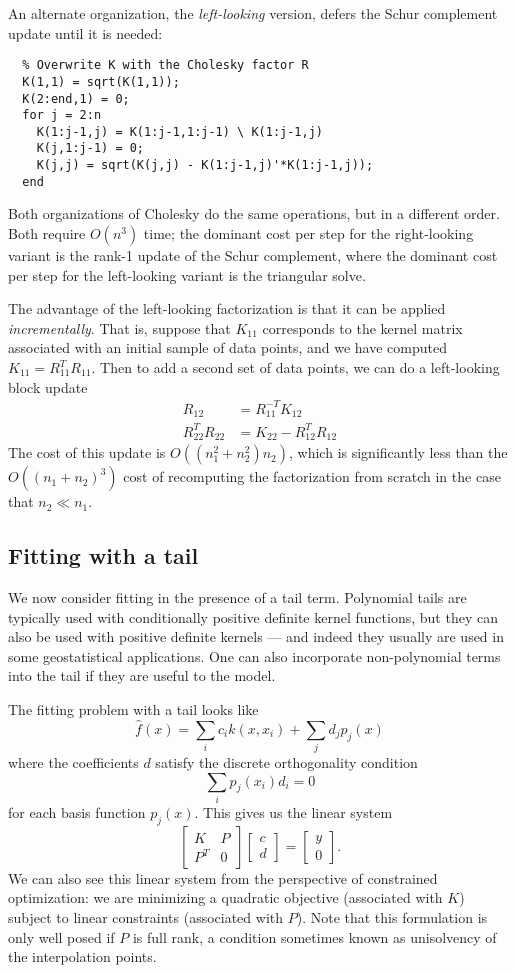 \documentclass[12pt, leqno]{article} %
\begin{document}
An alternate organization, the {\em left-looking} version,
defers the Schur complement update until it is needed:
\begin{lstlisting}
  % Overwrite K with the Cholesky factor R
  K(1,1) = sqrt(K(1,1));
  K(2:end,1) = 0;
  for j = 2:n
    K(1:j-1,j) = K(1:j-1,1:j-1) \ K(1:j-1,j)
    K(j,1:j-1) = 0;
    K(j,j) = sqrt(K(j,j) - K(1:j-1,j)'*K(1:j-1,j));
  end
\end{lstlisting}
Both organizations of Cholesky do the same operations, but in a
different order.  Both require $O(n^3)$ time; the dominant
cost per step for the right-looking variant is the rank-1 update
of the Schur complement, where the dominant cost per step for the
left-looking variant is the triangular solve.

The advantage of the left-looking factorization is that it can be
applied {\em incrementally}.  That is, suppose that $K_{11}$
corresponds to the kernel matrix associated with an initial sample
of data points, and we have computed $K_{11} = R_{11}^T R_{11}$.
Then to add a second set of data points, we can do a left-looking
block update
\begin{align*}
  R_{12} &= R_{11}^{-T} K_{12} \\
  R_{22}^T R_{22} &= K_{22} - R_{12}^T R_{12}
\end{align*}
The cost of this update is $O((n_1^2 + n_2^2) n_2)$, which is
significantly less than the $O((n_1 + n_2)^3)$ cost of recomputing the
factorization from scratch in the case that $n_2 \ll n_1$.

\subsection{Fitting with a tail}

We now consider fitting in the presence of a tail term.  Polynomial
tails are typically used with conditionally positive definite kernel
functions, but they can also be used with positive definite kernels
--- and indeed they usually are used in some geostatistical
applications.  One can also incorporate non-polynomial terms into
the tail if they are useful to the model.

The fitting problem with a tail looks like
\[
  \hat{f}(x) = \sum_i c_i k(x,x_i) + \sum_j d_j p_j(x)
\]
where the coefficients $d$ satisfy the discrete orthogonality
condition
\[
  \sum_i p_j(x_i) d_i = 0
\]
for each basis function $p_j(x)$.  This gives us the linear system
\[
  \begin{bmatrix} K & P \\ P^T & 0 \end{bmatrix}
  \begin{bmatrix} c \\ d \end{bmatrix} =
  \begin{bmatrix} y \\ 0 \end{bmatrix}.
\]
We can also see this linear system from the perspective of constrained
optimization: we are minimizing a quadratic objective (associated with $K$)
subject to linear constraints (associated with $P$).  Note that this
formulation is only well posed if $P$ is full rank, a condition
sometimes known as unisolvency of the interpolation points.
\end{document}
